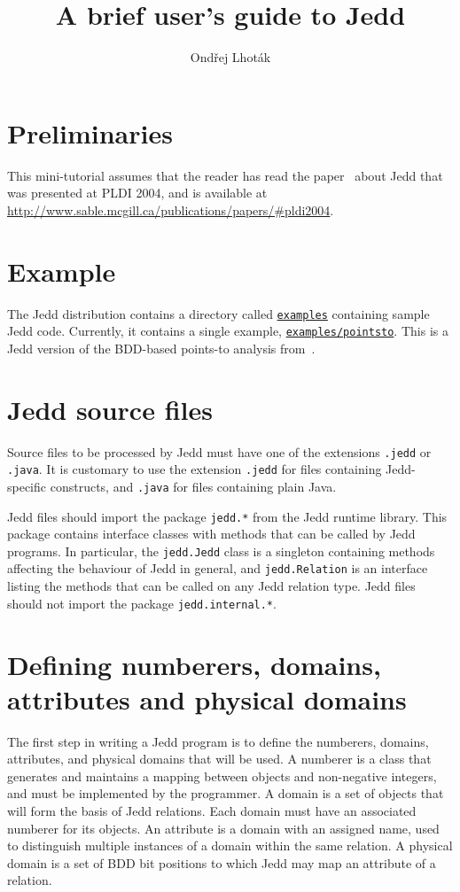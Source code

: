 \documentclass{article}
\title{A brief user's guide to Jedd}
\author{Ond\v{r}ej Lhot\'ak}
\begin{document}
\maketitle

\newcommand{\jeddpath}[1]{\href{http://svn.sable.mcgill.ca/soot/jedd/trunk/#1}{\nolinkurl{#1}}}

\section{Preliminaries}
This mini-tutorial assumes that the reader has
read the paper~\cite{Lhotak:2004:JBR} about Jedd that
was presented at PLDI 2004, and is available at
\url{http://www.sable.mcgill.ca/publications/papers/#pldi2004}.

\section{Example}
The Jedd distribution contains a directory called \jeddpath{examples}
containing sample Jedd code. Currently, it contains a single example,
\jeddpath{examples/pointsto}. This is a Jedd version of the BDD-based points-to
analysis from~\cite{Berndl:2003:PAU}.

\section{Jedd source files}
Source files to be processed by Jedd must have one of the extensions
{\tt .jedd} or {\tt .java}. It is customary to use the extension {\tt .jedd}
for files containing Jedd-specific constructs, and {\tt .java} for files
containing plain Java.

Jedd files should import the package {\tt jedd.*} from the Jedd runtime
library. This package contains interface classes with methods that can
be called by Jedd programs. In particular, the {\tt jedd.Jedd} class
is a singleton containing methods affecting the behaviour of Jedd in
general, and {\tt jedd.Relation} is an interface listing the methods
that can be called on any Jedd relation type. Jedd files should not
import the package {\tt jedd.internal.*}.

\section{Defining numberers, domains, attributes and physical domains}
The first step in writing a Jedd program is to define the numberers,
domains, attributes, and physical domains that will be used. A numberer
is a class that generates and maintains a mapping between objects and
non-negative integers, and must be implemented by the programmer. A
domain is a set of objects that will form the basis of Jedd relations.
Each domain must have an associated numberer for its objects. An
attribute is a domain with an assigned name, used to distinguish
multiple instances of a domain within the same relation. A physical
domain is a set of BDD bit positions to which Jedd may map an attribute
of a relation.
\end{document}
